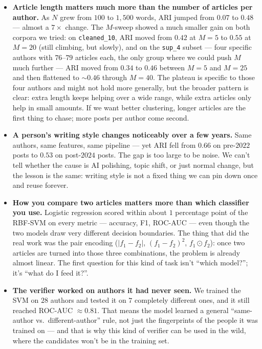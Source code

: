 \documentclass[11pt]{article}
\begin{document}
\begin{itemize}\setlength\itemsep{4pt}
  \item \textbf{Article length matters much more than the number of
        articles per author.} As $N$ grew from $100$ to $1{,}500$ words,
        ARI jumped from $0.07$ to $0.48$ --- almost a $7\times$ change.
        The $M$-sweep showed a much smaller gain on both corpora we
        tried: on \texttt{cleaned\_10}, ARI moved from $0.42$ at $M{=}5$
        to $0.55$ at $M{=}20$ (still climbing, but slowly), and on the
        \texttt{sup\_4} subset --- four specific authors with $76$--$79$
        articles each, the only group where we could push $M$ much
        further --- ARI moved from $0.34$ to $0.46$ between $M{=}5$ and
        $M{=}25$ and then flattened to $\sim\!0.46$ through $M{=}40$.
        The plateau is specific to those four authors and might not hold
        more generally, but the broader pattern is clear: extra length
        keeps helping over a wide range, while extra articles only help
        in small amounts. If we want better clustering, longer articles
        are the first thing to chase; more posts per author come second.

  \item \textbf{A person's writing style changes noticeably over a few
        years.} Same authors, same features, same pipeline --- yet ARI
        fell from $0.66$ on pre-$2022$ posts to $0.53$ on post-$2024$
        posts. The gap is too large to be noise. We can't tell whether
        the cause is AI polishing, topic shift, or just normal change,
        but the lesson is the same: writing style is not a fixed thing
        we can pin down once and reuse forever.

  \item \textbf{How you compare two articles matters more than which
        classifier you use.} Logistic regression scored within about
        $1$ percentage point of the RBF-SVM on every metric --- accuracy,
        F1, ROC-AUC --- even though the two models draw very different
        decision boundaries. The thing that did the real work was the
        pair encoding ($|f_1{-}f_2|$, $(f_1{-}f_2)^2$, $f_1 \odot f_2$):
        once two articles are turned into those three combinations, the
        problem is already almost linear. The first question for this
        kind of task isn't ``which model?''; it's ``what do I feed it?''.

  \item \textbf{The verifier worked on authors it had never seen.}
        We trained the SVM on $28$ authors and tested it on $7$
        completely different ones, and it still reached ROC-AUC
        $\approx 0.81$. That means the model learned a general
        ``same-author vs.\ different-author'' rule, not just the
        fingerprints of the people it was trained on --- and that is
        why this kind of verifier can be used in the wild, where the
        candidates won't be in the training set.


\end{itemize}
\end{document}
